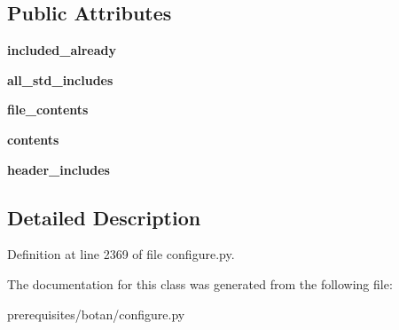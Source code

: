 \subsection*{Public Attributes}
\begin{DoxyCompactItemize}
\item 
\mbox{\label{classconfigure_1_1_amalgamation_header_a88ef8165d71017029c5190d4cf4bacc6}} 
{\bfseries included\+\_\+already}
\item 
\mbox{\label{classconfigure_1_1_amalgamation_header_a413bbff77c93d6314f2eaa931d107b41}} 
{\bfseries all\+\_\+std\+\_\+includes}
\item 
\mbox{\label{classconfigure_1_1_amalgamation_header_aabe53cdfa2037b4be9aa2038a4416584}} 
{\bfseries file\+\_\+contents}
\item 
\mbox{\label{classconfigure_1_1_amalgamation_header_a81ef2f701591551e178f7d5b16bc19ae}} 
{\bfseries contents}
\item 
\mbox{\label{classconfigure_1_1_amalgamation_header_a101ccdd0fe5ed70b67481c19e470d1d4}} 
{\bfseries header\+\_\+includes}
\end{DoxyCompactItemize}


\subsection{Detailed Description}


Definition at line 2369 of file configure.\+py.



The documentation for this class was generated from the following file\+:\begin{DoxyCompactItemize}
\item 
prerequisites/botan/configure.\+py\end{DoxyCompactItemize}
